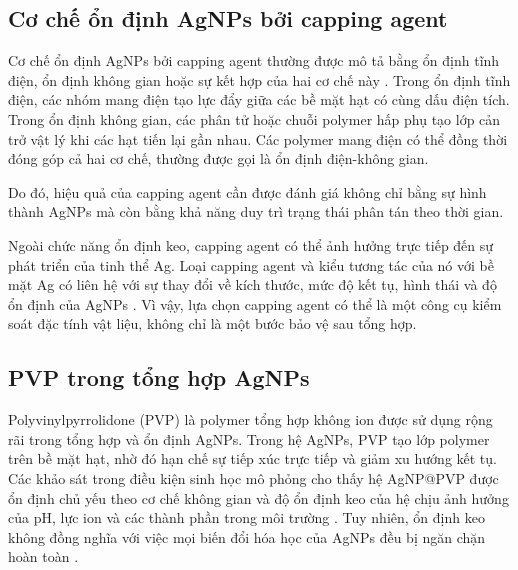 \subsection{Cơ chế ổn định AgNPs bởi capping agent}
Cơ chế ổn định AgNPs bởi capping agent thường được mô tả bằng ổn định tĩnh điện, ổn định không gian hoặc sự kết hợp của hai cơ chế này \parencite{restrepo2021}.
Trong ổn định tĩnh điện, các nhóm mang điện tạo lực đẩy giữa các bề mặt hạt có cùng dấu điện tích.
Trong ổn định không gian, các phân tử hoặc chuỗi polymer hấp phụ tạo lớp cản trở vật lý khi các hạt tiến lại gần nhau.
Các polymer mang điện có thể đồng thời đóng góp cả hai cơ chế, thường được gọi là ổn định điện-không gian.
\par
Do đó, hiệu quả của capping agent cần được đánh giá không chỉ bằng sự hình thành AgNPs mà còn bằng khả năng duy trì trạng thái phân tán theo thời gian.
\par
Ngoài chức năng ổn định keo, capping agent có thể ảnh hưởng trực tiếp đến sự phát triển của tinh thể Ag.
Loại capping agent và kiểu tương tác của nó với bề mặt Ag có liên hệ với sự thay đổi về kích thước, mức độ kết tụ, hình thái và độ ổn định của AgNPs \parencite{restrepo2021}.
Vì vậy, lựa chọn capping agent có thể là một công cụ kiểm soát đặc tính vật liệu, không chỉ là một bước bảo vệ sau tổng hợp.
\subsection{PVP trong tổng hợp AgNPs}
Polyvinylpyrrolidone (PVP) là polymer tổng hợp không ion được sử dụng rộng rãi trong tổng hợp và ổn định AgNPs.
Trong hệ AgNPs, PVP tạo lớp polymer trên bề mặt hạt, nhờ đó hạn chế sự tiếp xúc trực tiếp và giảm xu hướng kết tụ.
Các khảo sát trong điều kiện sinh học mô phỏng cho thấy hệ AgNP@PVP được ổn định chủ yếu theo cơ chế không gian và độ ổn định keo của hệ chịu ảnh hưởng của pH, lực ion và các thành phần trong môi trường \parencite{ronavari2021}.
Tuy nhiên, ổn định keo không đồng nghĩa với việc mọi biến đổi hóa học của AgNPs đều bị ngăn chặn hoàn toàn \parencite{ronavari2021}.
